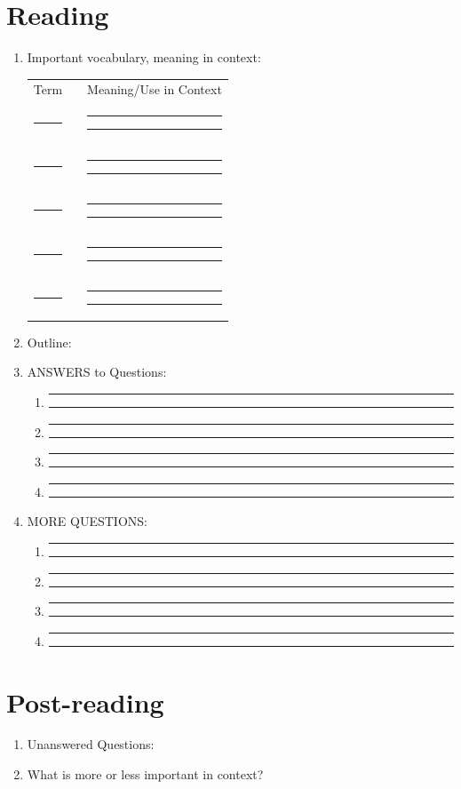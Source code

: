 \documentclass[12pt]{article}
\newcommand{\myrule}{\rule[-0.1mm]{1.5in}{0.1mm}}
\newcommand{\longrule}{\myrule\myrule}
\begin{document}
\section{Reading}
\begin{enumerate}
	\item Important vocabulary, meaning in context:\\
	\begin{tabular}{ccc}
	Term & \hspace{0.3in} &Meaning/Use in Context \\
	\myrule & & \longrule \\
	\myrule & & \longrule \\
	\myrule & & \longrule \\
	\myrule & & \longrule \\
	\myrule & & \longrule \\
	\end{tabular}	
	\item Outline:
		\vspace{4in}
		
	\newpage	
		
	\item ANSWERS to Questions:
	\begin{enumerate}
	\item \longrule 
	\item \longrule 
	\item \longrule 
	\item \longrule
	\end{enumerate}
	\item MORE QUESTIONS:
	\begin{enumerate}
	\item \longrule 
	\item \longrule 
	\item \longrule 
	\item \longrule
	\end{enumerate}
\end{enumerate}


\section{Post-reading}
\begin{enumerate}
	\item Unanswered Questions:
	
	\vspace{2in}
	
	\item What is more or less important in context?
\end{enumerate}
\end{document}
